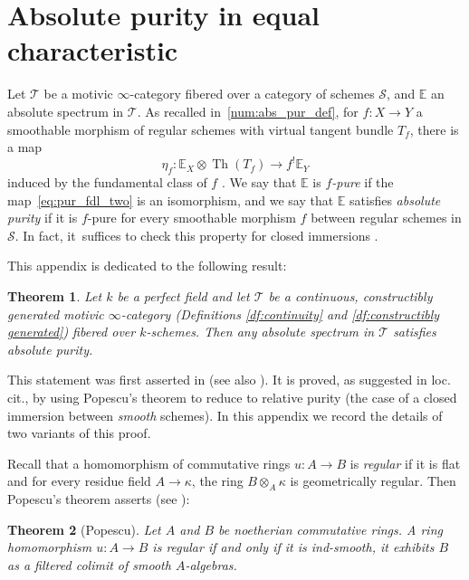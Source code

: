 \documentclass[JEP,XML,SOM,Unicode]{cedram}
\newcommand{\base}{\mathscr S}
\newcommand{\T}{\mathscr T}
\newcommand{\E}{\mathbb E}
\DeclareMathOperator{\Th}{Th}
\newtheorem{thm}{Theorem}[section]
\theoremstyle{remark}
\theoremstyle{definition}
\numberwithin{equation}{thm}
\begin{document}
\section{Absolute purity in equal characteristic}
\label{apd:popescu}

Let $\T$ be a motivic $\infty$-category fibered over a category of schemes $\base$, and $\E$ an absolute spectrum in $\T$.
As recalled in~\ref{num:abs_pur_def}, for $f:X\to Y$ a smoothable morphism of regular schemes with virtual tangent bundle $T_f$, there is a map
\begin{equation}
\label{eq:pur_fdl_two}
\eta_f:\E_X\otimes\Th(T_f)\to f^!\E_Y
\end{equation}
induced by the fundamental class of $f$ \cite[Def.\,4.3.7]{DJK}.
We say that $\E$ is \emph{$f$-pure} if the map~\eqref{eq:pur_fdl_two} is an isomorphism, and we say that $\E$ satisfies \emph{absolute purity} if it is $f$-pure for every smoothable morphism $f$ between regular schemes in $\base$.
In fact, it~suffices to check this property for closed immersions \cite[Rem.\,4.3.12(i)]{DJK}.

This appendix is dedicated to the following result:

\begin{thm}
\label{thm:abs_pur_eqchar}
Let $k$ be a perfect field and let $\T$ be a continuous, constructibly generated motivic $\infty$-category (Definitions \ref{df:continuity} and \ref{df:constructibly generated}) fibered over $k$-schemes.
Then any absolute spectrum in $\T$ satisfies absolute purity.
\end{thm}

This statement was first asserted in \cite[Ex.\,1.3.4(2)]{DegliseOrientation} (see also \cite[Prop.\,6.2]{CD5}).
It is proved, as suggested in loc.\,cit., by using Popescu's theorem to reduce to relative purity (the case of a closed immersion between \emph{smooth} schemes).
In this appendix we record the details of two variants of this proof.

Recall that a homomorphism of commutative rings $u:A\to B$ is \emph{regular} if it is flat and for every residue field $A \to \kappa$, the ring $B\otimes_A\kappa$ is geometrically regular. Then Popescu's theorem asserts (see \cite[Th.\,1.1]{Spivakovsky}):\enlargethispage{-\baselineskip}%

\begin{thm}[Popescu]
\label{thm:popescu}
Let $A$ and $B$ be noetherian commutative rings.
A ring homomorphism $u:A \to B$ is regular if and only if it is ind-smooth, \ie it exhibits $B$ as a filtered colimit of smooth $A$-algebras.
\end{thm}
\end{document}
